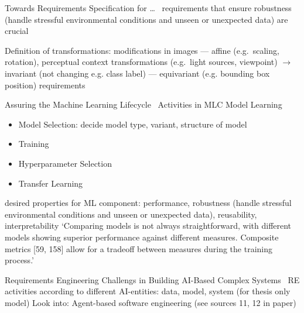 Towards Requirements Specification for \ldots~\cite{hu_towards_2020}
requirements that ensure robustness (handle stressful environmental conditions and unseen or
unexpected data) are crucial

Definition of transformations: modifications in images
--- affine (e.g.\ scaling, rotation), perceptual context transformations (e.g.\ light sources, viewpoint)
$\rightarrow$ invariant (not changing e.g. class label) --- equivariant (e.g. bounding
                box position) requirements


Assuring the Machine Learning Lifecycle~\cite{ashmore_assuring_2021}
Activities in MLC Model Learning
\begin{itemize}
    \item Model Selection: decide model type, variant, structure of model
    \item Training
    \item Hyperparameter Selection
    \item Transfer Learning
\end{itemize}
desired properties for ML component: performance, robustness (handle stressful environmental
conditions and unseen or unexpected data), reusability, interpretability
`Comparing models is not always straightforward, with different models showing superior performance
against different measures. Composite metrics [59, 158] allow for a tradeoff between measures
during the training process.'

Requirements Engineering Challengs in Building AI-Based Complex Systems~\cite{belani_requirements_2019}
RE activities according to different AI-entities: data, model, system (for thesis only model)
Look into: Agent-based software engineering (see sources 11, 12 in paper)

